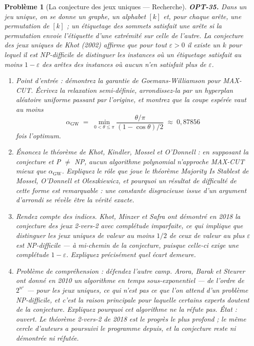 \documentclass[11pt]{article}
\newtheorem{problem}{Problème}
\begin{document}
\bigskip

\begin{problem}[{La conjecture des jeux uniques --- Recherche}]
\textbf{OPT-35.} Dans un \textit{jeu unique}, on se donne un graphe, un alphabet $[k]$ et, pour
chaque arête, une permutation de $[k]$ ; un étiquetage des sommets satisfait une arête si la
permutation envoie l'étiquette d'une extrémité sur celle de l'autre. La conjecture des jeux
uniques de Khot (2002) affirme que pour tout $\varepsilon >0$ il existe un $k$ pour lequel
il est NP-difficile de distinguer les instances où un étiquetage satisfait au moins
$1 - \varepsilon$ des arêtes des instances où aucun n'en satisfait plus de $\varepsilon$.
\begin{enumerate}
\item[(a)] Point d'entrée : démontrez la garantie de Goemans-Williamson pour MAX-CUT. Écrivez la
relaxation semi-définie, arrondissez-la par un hyperplan aléatoire uniforme passant par
l'origine, et montrez que la coupe espérée vaut au moins
\[ \alpha_{\mathrm{GW}} \;=\; \min_{0 <\theta \le \pi} \frac{\theta/\pi}{(1 - \cos\theta)/2} \;\approx\; 0{,}87856 \]
fois l'optimum.
\item[(b)] Énoncez le théorème de Khot, Kindler, Mossel et O'Donnell : en supposant la conjecture et
P $\ne$ NP, aucun algorithme polynomial n'approche MAX-CUT mieux que
$\alpha_{\mathrm{GW}}$. Expliquez le rôle que joue le théorème \og{} Majority Is Stablest \fg{} de
Mossel, O'Donnell et Oleszkiewicz, et pourquoi un résultat de difficulté de cette forme est
remarquable : une constante disgracieuse issue d'un argument d'arrondi se révèle être la vérité
exacte.
\item[(c)] Rendez compte des indices. Khot, Minzer et Safra ont démontré en 2018 la conjecture des jeux
2-vers-2 avec complétude imparfaite, ce qui implique que distinguer les jeux uniques de valeur au
moins $1/2$ de ceux de valeur au plus $\varepsilon$ est NP-difficile --- \og{} à mi-chemin \fg{} de la
conjecture, puisque celle-ci exige une complétude $1 - \varepsilon$. Expliquez précisément
quel écart demeure.
\item[(d)] Problème de compréhension : défendez l'autre camp. Arora, Barak et Steurer ont donné en 2010
un algorithme en temps sous-exponentiel --- de l'ordre de $2^{n^{\varepsilon}}$ --- pour les jeux
uniques, ce qui n'est pas ce que l'on attend d'un problème NP-difficile, et c'est la raison
principale pour laquelle certains experts doutent de la conjecture. Expliquez pourquoi cet
algorithme ne la réfute pas.
\textit{État : ouvert. Le théorème 2-vers-2 de 2018 est le progrès le plus profond ; le même cercle
d'auteurs a poursuivi le programme depuis, et la conjecture reste ni démontrée ni réfutée.}
\end{enumerate}

\end{problem}
\end{document}
